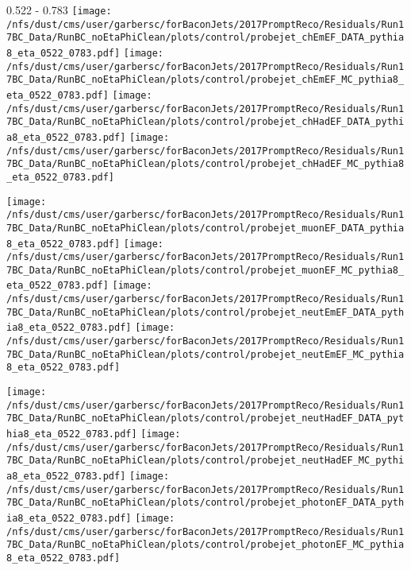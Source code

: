 \documentclass[t,compress]{beamer}
\begin{document}
\begin{frame}{0.522 - 0.783}
	\texttt{[image: /nfs/dust/cms/user/garbersc/forBaconJets/2017PromptReco/Residuals/Run17BC\_Data/RunBC\_noEtaPhiClean/plots/control/probejet\_chEmEF\_DATA\_pythia8\_eta\_0522\_0783.pdf]}
	\texttt{[image: /nfs/dust/cms/user/garbersc/forBaconJets/2017PromptReco/Residuals/Run17BC\_Data/RunBC\_noEtaPhiClean/plots/control/probejet\_chEmEF\_MC\_pythia8\_eta\_0522\_0783.pdf]}
	\texttt{[image: /nfs/dust/cms/user/garbersc/forBaconJets/2017PromptReco/Residuals/Run17BC\_Data/RunBC\_noEtaPhiClean/plots/control/probejet\_chHadEF\_DATA\_pythia8\_eta\_0522\_0783.pdf]}
	\texttt{[image: /nfs/dust/cms/user/garbersc/forBaconJets/2017PromptReco/Residuals/Run17BC\_Data/RunBC\_noEtaPhiClean/plots/control/probejet\_chHadEF\_MC\_pythia8\_eta\_0522\_0783.pdf]}
\newline

\vspace{-0.65cm}
	\texttt{[image: /nfs/dust/cms/user/garbersc/forBaconJets/2017PromptReco/Residuals/Run17BC\_Data/RunBC\_noEtaPhiClean/plots/control/probejet\_muonEF\_DATA\_pythia8\_eta\_0522\_0783.pdf]}
	\texttt{[image: /nfs/dust/cms/user/garbersc/forBaconJets/2017PromptReco/Residuals/Run17BC\_Data/RunBC\_noEtaPhiClean/plots/control/probejet\_muonEF\_MC\_pythia8\_eta\_0522\_0783.pdf]}
	\texttt{[image: /nfs/dust/cms/user/garbersc/forBaconJets/2017PromptReco/Residuals/Run17BC\_Data/RunBC\_noEtaPhiClean/plots/control/probejet\_neutEmEF\_DATA\_pythia8\_eta\_0522\_0783.pdf]}
	\texttt{[image: /nfs/dust/cms/user/garbersc/forBaconJets/2017PromptReco/Residuals/Run17BC\_Data/RunBC\_noEtaPhiClean/plots/control/probejet\_neutEmEF\_MC\_pythia8\_eta\_0522\_0783.pdf]}
\newline

\vspace{-0.65cm}
	\texttt{[image: /nfs/dust/cms/user/garbersc/forBaconJets/2017PromptReco/Residuals/Run17BC\_Data/RunBC\_noEtaPhiClean/plots/control/probejet\_neutHadEF\_DATA\_pythia8\_eta\_0522\_0783.pdf]}
	\texttt{[image: /nfs/dust/cms/user/garbersc/forBaconJets/2017PromptReco/Residuals/Run17BC\_Data/RunBC\_noEtaPhiClean/plots/control/probejet\_neutHadEF\_MC\_pythia8\_eta\_0522\_0783.pdf]}
	\texttt{[image: /nfs/dust/cms/user/garbersc/forBaconJets/2017PromptReco/Residuals/Run17BC\_Data/RunBC\_noEtaPhiClean/plots/control/probejet\_photonEF\_DATA\_pythia8\_eta\_0522\_0783.pdf]}
	\texttt{[image: /nfs/dust/cms/user/garbersc/forBaconJets/2017PromptReco/Residuals/Run17BC\_Data/RunBC\_noEtaPhiClean/plots/control/probejet\_photonEF\_MC\_pythia8\_eta\_0522\_0783.pdf]}
\end{frame}
\end{document}
